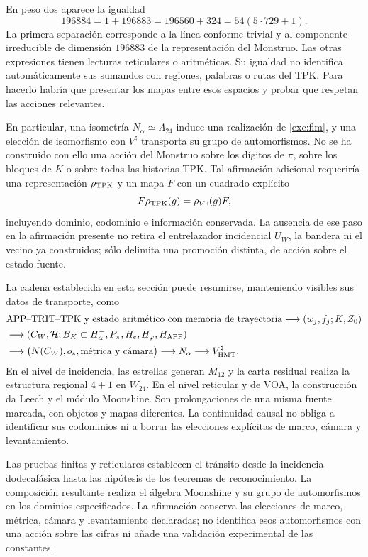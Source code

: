 En peso dos aparece la igualdad
\[
 196884=1+196883=196560+324=54(5\cdot729+1).
\]
La primera separación corresponde a la línea conforme trivial y al
componente irreducible de dimensión $196883$ de la representación
del Monstruo. Las otras expresiones tienen lecturas reticulares o
aritméticas. Su igualdad no identifica automáticamente sus sumandos
con regiones, palabras o rutas del TPK. Para hacerlo habría que
presentar los mapas entre esos espacios y probar que respetan las
acciones relevantes.

\newpage
En particular, una isometría $N_\alpha\simeq\Lambda_{24}$ induce
una realización de \eqref{exc:flm}, y una elección de isomorfismo
con $V^\natural$ transporta su grupo de automorfismos. No se ha
construido con ello una acción del Monstruo sobre los dígitos de
$\pi$, sobre los bloques de $K$ o sobre todas las historias TPK.
Tal afirmación adicional requeriría una representación
$\rho_{\rm TPK}$ y un mapa $F$ con un cuadrado explícito
\[
 F\rho_{\rm TPK}(g)=\rho_{V^\natural}(g)F,
\]
incluyendo dominio, codominio e información conservada. La ausencia
de ese paso en la afirmación presente no retira el entrelazador
incidencial $U_W$, la bandera ni el vecino ya construidos; sólo
delimita una promoción distinta, de acción sobre el estado fuente.

La cadena establecida en esta sección puede resumirse, manteniendo
visibles sus datos de transporte, como
\begin{align*}
 &\text{APP--TRIT--TPK y estado aritmético con memoria de trayectoria}
   \longrightarrow (w_j,f_j;K,Z_0)\\
 &\longrightarrow (C_W,\mathcal H;B_K\subset H^-_\alpha,
                   P_\pi,H_e,H_\varphi,H_{\rm APP})\\
 &\longrightarrow \bigl(N(C_W),o_*,\text{métrica y cámara}\bigr)
   \longrightarrow N_\alpha
   \longrightarrow V^\natural_{\rm HMT}.
\end{align*}
En el nivel de incidencia, las estrellas generan $M_{12}$ y la
carta residual realiza la estructura regional $4+1$ en $W_{24}$.
En el nivel reticular y de VOA, la construcción da Leech y el módulo
Moonshine. Son prolongaciones de una misma fuente marcada, con
objetos y mapas diferentes. La continuidad causal no obliga a
identificar sus codominios ni a borrar las elecciones explícitas
de marco, cámara y levantamiento.

Las pruebas finitas y reticulares establecen el tránsito desde la
incidencia dodecafásica hasta las hipótesis de los teoremas de
reconocimiento. La composición resultante realiza el álgebra Moonshine
y su grupo de automorfismos en los dominios especificados.
La afirmación conserva las elecciones de marco, métrica, cámara y
levantamiento declaradas; no identifica esos automorfismos con una
acción sobre las cifras ni añade una validación experimental de las
constantes.
